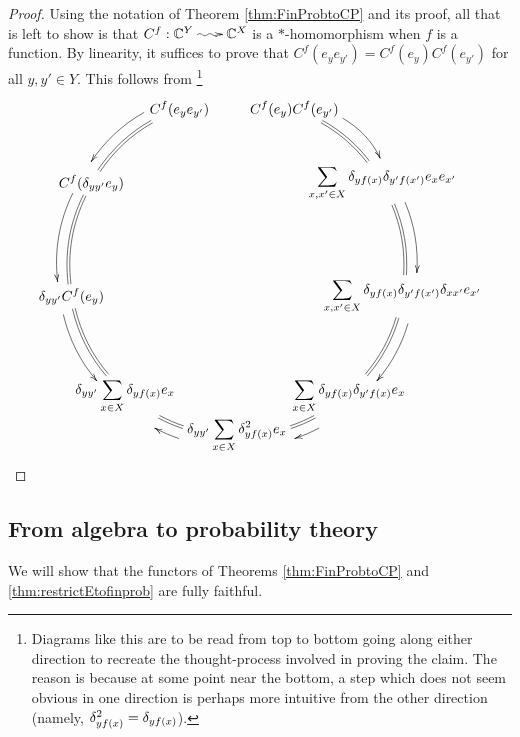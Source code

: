 \documentclass[12pt]{article}
\makeatletter
\theoremstyle{theorem}
\theoremstyle{definition}
\numberwithin{equation}{section}
\let\C=\Chi \let\W=\Omega
\newcommand{\be}{\begin{equation}}
\newcommand{\ee}{\end{equation}}
\newcommand{\bprf}{\begin{proof}}
\newcommand{\eprf}{\end{proof}}
\newcommand{\<}{\langle}
\renewcommand{\>}{\rangle}
\def\C{{{\mathbb C}}}
\newcommand{\stoch}{\;\xy0;/r.25pc/:\ar@{~>}(3,0);(-3,0);\endxy\;}
\newcommand{\ds}{\displaystyle}
\makeatother
\begin{document}
\bprf
Using the notation of Theorem \ref{thm:FinProbtoCP} and its proof, 
all that is left to show is that $C^{f}:\C^{Y}\stoch\C^{X}$ is a 
$*$-homomorphism when $f$ is a function. By linearity, it suffices to prove that 
$C^{f}(e_{y}e_{y'})=C^{f}(e_{y})C^{f}(e_{y'})$
for all $y,y'\in Y.$ This follows from%
\footnote{Diagrams like this are to be read from top to bottom going along
either direction to recreate the thought-process involved in proving the claim.
The reason is because at some point near the bottom, a step which does not
seem obvious in one direction is perhaps more intuitive from the other 
direction (namely, $\delta_{yf(x)}^{2}=\delta_{yf(x)}$).}
\be
\xy0;/r.50pc/:
(6.84040286651,18.7938524157)*+{\ds C^{f}(e_y)C^{f}(e_{y'})}="1";%
(17.3205080757,10)*+{\ds\sum_{x,x'\in X}\de_{yf(x)}\de_{y'f(x')}e_{x}e_{x'}}="2";%
(19.6961550602,-3.47296355334)*+{\ds\sum_{x,x'\in X}\de_{yf(x)}\de_{y'f(x')}\de_{xx'}e_{x'}}="3";%
(12.8557521937,-15.3208888624)*+{\;\;\ds\sum_{x\in X}\de_{yf(x)}\de_{y'f(x)}e_{x}}="4";%
(0,-20)*+{\ds\de_{yy'}\sum_{x\in X}\de_{yf(x)}^2e_{x}}="5";%
(-12.8557521937,-15.3208888624)*+{\ds\de_{yy'}\sum_{x\in X}\de_{yf(x)}e_{x}\;\;}="6";
(-19.6961550602,-3.47296355334)*+{\ds\de_{yy'}C^{f}(e_{y})}="7";
(-17.3205080757,10)*+{\ds C^{f}(\de_{yy'}e_{y})}="8";
(-6.84040286651,18.7938524157)*+{\ds C^{f}(e_{y}e_{y'})}="9";
{\ar@{=}@/^0.65pc/"1";"2"};
{\ar@{->}@<1.0ex>@/^0.50pc/(12.04040286651,17.2938524157);"2"};
{\ar@{=}@/^0.65pc/"2";"3"};
{\ar@{->}@<2.0ex>@/^0.65pc/"2";"3"};
{\ar@{=}@/^0.65pc/"3";"4"};
{\ar@{->}@<2.0ex>@/^0.65pc/"3";"4"};
{\ar@{=}@/^0.65pc/"4";"5"};
{\ar@{->}@<2.0ex>@/^0.65pc/"4";"5"};
{\ar@{=}@/^0.65pc/"5";"6"};
{\ar@{->}@<2.0ex>@/^0.65pc/"5";"6"};
{\ar@{=}@/^0.65pc/"6";"7"};
{\ar@{->}@<-2.0ex>@/_0.65pc/"7";"6"};
{\ar@{=}@/^0.65pc/"7";"8"};
{\ar@{->}@<-2.0ex>@/_0.65pc/"8";"7"};
{\ar@{=}@/^0.65pc/"8";"9"};
{\ar@{->}@<-2.0ex>@/_0.65pc/"9";"8"};
\endxy
\ee
\eprf



\subsection{From algebra to probability theory}
\label{sec:fdfullyfaithful}

We will show that the functors of Theorems
\ref{thm:FinProbtoCP} and \ref{thm:restrictEtofinprob} are fully faithful. 
\end{document}
